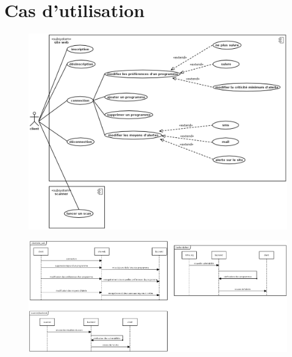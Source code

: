 \section{Cas d’utilisation}
\begin{figure}[!h]
  \includegraphics[width=18cm]{uml1.png}
\end{figure}
\begin{figure}[!h]
  \includegraphics[width=18cm]{uml2.png}
\end{figure}

